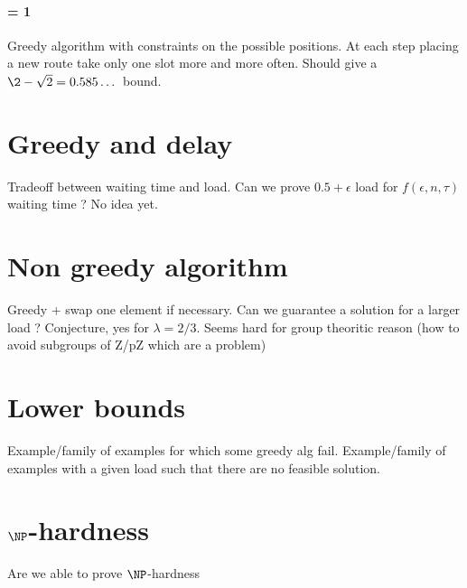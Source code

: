 \documentclass[10pt, conference, letterpaper]{IEEEtran}
\begin{document}
\paragraph{\tau = 1}

Greedy algorithm with constraints on the possible positions. 
At each step placing a new route take only one slot more and more often. 
Should give a $\2 - \sqrt{2} = 0.585\dots$ bound.

\section{Greedy and delay}

Tradeoff between waiting time and load. Can we prove $0.5 + \epsilon$ load for $f(\epsilon,n,\tau)$ waiting time ?  No idea yet.


\section{Non greedy algorithm}

Greedy + swap one element if necessary. 
Can we guarantee a solution for a larger load ? Conjecture, yes for $\lambda = 2/3$. 
Seems hard for group theoritic reason (how to avoid subgroups of Z/pZ which are a problem)

\section{Lower bounds}

Example/family of examples for which some greedy alg fail.
Example/family of examples with a given load such that there are no feasible solution.

\section{$\NP$-hardness}

Are we able to prove $\NP$-hardness

% 
% 
\end{document}
